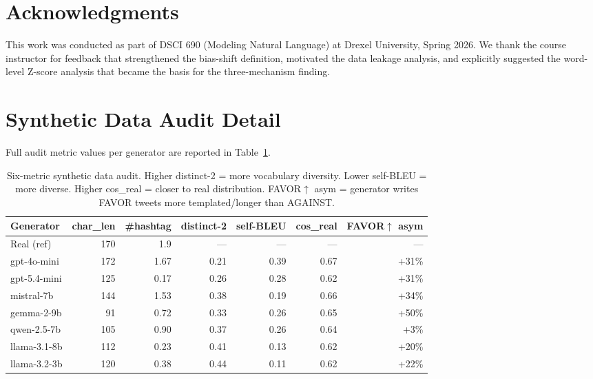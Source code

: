 \documentclass[11pt]{article}
\begin{document}
\section*{Acknowledgments}

This work was conducted as part of DSCI 690 (Modeling Natural Language) at Drexel University, Spring 2026. We thank the course instructor for feedback that strengthened the bias-shift definition, motivated the data leakage analysis, and explicitly suggested the word-level Z-score analysis that became the basis for the three-mechanism finding.



\appendix

\section{Synthetic Data Audit Detail}
\label{sec:audit}

Full audit metric values per generator are reported in Table~\ref{tab:audit}.

\begin{table}[t]
\centering
\small
\begin{tabular}{lrrrrrr}
\toprule
\textbf{Generator} & \textbf{char\_len} & \textbf{\#hashtag} & \textbf{distinct-2} & \textbf{self-BLEU} & \textbf{cos\_real} & \textbf{FAVOR$\uparrow$ asym} \\
\midrule
Real (ref)    & 170 & 1.9  & ---  & ---  & ---  & --- \\
gpt-4o-mini   & 172 & 1.67 & 0.21 & 0.39 & 0.67 & +31\% \\
gpt-5.4-mini  & 125 & 0.17 & 0.26 & 0.28 & 0.62 & +31\% \\
mistral-7b    & 144 & 1.53 & 0.38 & 0.19 & 0.66 & +34\% \\
gemma-2-9b    & 91  & 0.72 & 0.33 & 0.26 & 0.65 & +50\% \\
qwen-2.5-7b   & 105 & 0.90 & 0.37 & 0.26 & 0.64 & +3\%  \\
llama-3.1-8b  & 112 & 0.23 & 0.41 & 0.13 & 0.62 & +20\% \\
llama-3.2-3b  & 120 & 0.38 & 0.44 & 0.11 & 0.62 & +22\% \\
\bottomrule
\end{tabular}
\caption{Six-metric synthetic data audit. Higher distinct-2 = more vocabulary diversity. Lower self-BLEU = more diverse. Higher cos\_real = closer to real distribution. FAVOR$\uparrow$ asym = generator writes FAVOR tweets more templated/longer than AGAINST.}
\label{tab:audit}
\end{table}
\end{document}
